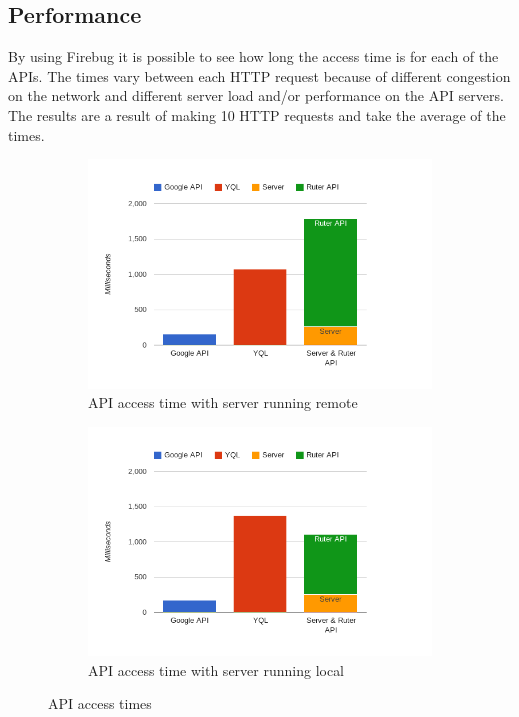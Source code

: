 \documentclass[10pt,a4paper]{article}
\begin{document}
\subsection{Performance}
\label{sec:performance}
By using Firebug it is possible to see how long the access time is for each of the APIs. The times vary between each HTTP request because of different congestion on the network and different server load and/or performance on the API servers. The results are a result of making 10 HTTP requests and take the average of the times. 
\begin{figure}
\centering
\begin{subfigure}{\textwidth}
\includegraphics[width=\textwidth]{../apitimes/apitiderHeroku}
\caption{API access time with server running remote}
\label{fig:time_heroku}
\end{subfigure}
\begin{subfigure}{\textwidth}
\includegraphics[width=\textwidth]{../apitimes/apitiderLocalhost}
\caption{API access time with server running local}
\label{fig:time_localhost}
\end{subfigure}
\caption{API access times}
\label{fig:time}
\end{figure}
\end{document}
